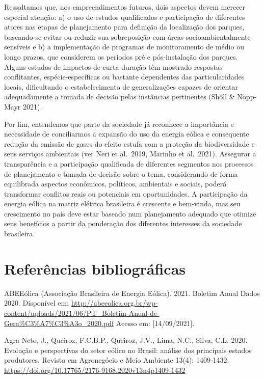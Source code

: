 \documentclass[
  oneside]{scrbook}
\begin{document}
Ressaltamos que, nos empreendimentos futuros, dois aspectos devem merecer especial atenção: a) o uso de estudos qualificados e participação de diferentes atores nas etapas de planejamento para definição da localização dos parques, buscando-se evitar ou reduzir sua sobreposição com áreas socioambientalmente sensíveis e b) a implementação de programas de monitoramento de médio ou longo prazos, que considerem os períodos pré e pós-instalação dos parques. Alguns estudos de impactos de curta duração têm mostrado respostas conflitantes, espécie-específicas ou bastante dependentes das particularidades locais, dificultando o estabelecimento de generalizações capazes de orientar adequadamente a tomada de decisão pelas instâncias pertinentes (Shöll \& Nopp-Mayr 2021).

Por fim, entendemos que parte da sociedade já reconhece a importância e necessidade de conciliarmos a expansão do uso da energia eólica e consequente redução da emissão de gases do efeito estufa com a proteção da biodiversidade e seus serviços ambientais (ver Neri et al.~2019, Marinho et al.~2021). Assegurar a transparência e a participação qualificada de diferentes segmentos nos processos de planejamento e tomada de decisão sobre o tema, considerando de forma equilibrada aspectos econômicos, políticos, ambientais e sociais, poderá transformar conflitos reais ou potenciais em oportunidades. A participação da energia eólica na matriz elétrica brasileira é crescente e bem-vinda, mas seu crescimento no país deve estar baseado num planejamento adequado que otimize seus benefícios a partir da ponderação dos diferentes interesses da sociedade brasileira.

\newpage

\hypertarget{referuxeancias-bibliogruxe1ficas}{%
\section{Referências bibliográficas}\label{referuxeancias-bibliogruxe1ficas}}

ABEEólica (Associação Brasileira de Energia Eólica). 2021. Boletim Anual Dados 2020. Disponível em: \url{http://abeeolica.org.br/wp-content/uploads/2021/06/PT_Boletim-Anual-de-Gera\%C3\%A7\%C3\%A3o_2020.pdf} Acesso em: {[}14/09/2021{]}.

Agra Neto, J., Queiroz, F.C.B.P., Queiroz, J.V., Lima, N.C., Silva, C.L. 2020. Evolução e perspectivas do setor eólico no Brasil: análise dos principais estados produtores. Revista em Agronegócio e Meio Ambiente 13(4): 1409-1432. \url{https://doi.org/10.17765/2176-9168.2020v13n4p1409-1432}
\end{document}
